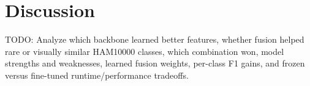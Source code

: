 \section{Discussion}

TODO: Analyze which backbone learned better features, whether fusion helped rare or visually similar HAM10000 classes, which combination won, model strengths and weaknesses, learned fusion weights, per-class F1 gains, and frozen versus fine-tuned runtime/performance tradeoffs.
